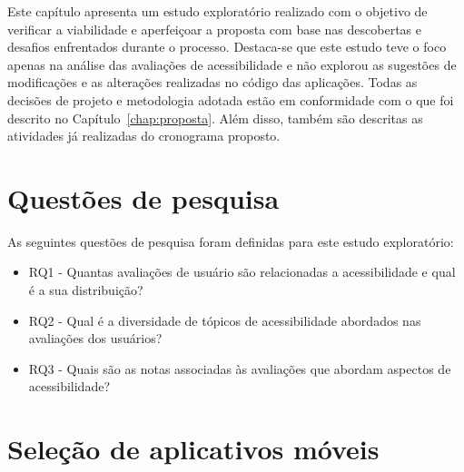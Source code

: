 Este capítulo apresenta um estudo exploratório realizado com o objetivo de verificar a viabilidade e aperfeiçoar a proposta com base nas descobertas e desafios enfrentados durante o processo. Destaca-se que este estudo teve o foco apenas na análise das avaliações de acessibilidade e não explorou as sugestões de modificações e as alterações realizadas no código das aplicações. Todas as decisões de projeto e metodologia adotada estão em conformidade com o que foi descrito no Capítulo~\ref{chap:proposta}.
Além disso, também são descritas as atividades já realizadas do cronograma proposto.

\section{Questões de pesquisa}

As seguintes questões de pesquisa foram definidas para este estudo exploratório:
\begin{itemize}
 \item RQ1 - Quantas avaliações de usuário são relacionadas a acessibilidade e qual é a sua distribuição? 
 \item RQ2 - Qual é a diversidade de tópicos de acessibilidade abordados nas avaliações dos usuários?
 \item RQ3 - Quais são as notas associadas às avaliações que abordam aspectos de acessibilidade?  
\end{itemize}

\section{Seleção de aplicativos móveis}



